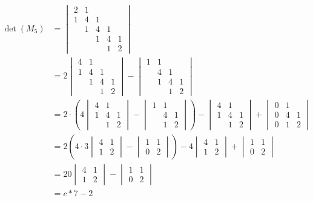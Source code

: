 \documentclass{article}
\begin{document}
\begin{align}
  \det (M_5) &= \begin{vmatrix}
      2 & 1 \\
      1 & 4 & 1\\
        & 1 & 4 & 1 \\
        & & 1 & 4 & 1 \\
        & & & 1 & 2
    \end{vmatrix} \\
  &= 2 \begin{vmatrix}
    4 & 1 \\ 1 & 4 & 1 \\
      & 1 & 4 & 1 \\ & & 1 & 2
  \end{vmatrix} - \begin{vmatrix}
    1 & 1 \\
      & 4 & 1 \\
      & 1 & 4 & 1 \\
      & & 1 & 2
  \end{vmatrix} \\
  &= 2 \cdot \left( 4 \begin{vmatrix}
    4 & 1 \\ 1 & 4 & 1 \\ & 1 & 2
  \end{vmatrix} - \begin{vmatrix}
    1 & 1 \\ & 4 & 1 \\ & 1 & 2
  \end{vmatrix} \right) - \begin{vmatrix}
    4 & 1 \\ 1 & 4 & 1 \\ & 1 & 2
  \end{vmatrix} + \begin{vmatrix}
    0 & 1 & \\ 0 & 4 & 1 \\ 0 & 1 & 2
  \end{vmatrix} \\
  &= 2 \left( 
    4 \cdot 3 \begin{vmatrix}
      4 & 1 \\ 1 & 2
    \end{vmatrix} - \begin{vmatrix}
      1 & 1 \\ 0 & 2
    \end{vmatrix}
    \right) - 4 \begin{vmatrix}
      4 & 1 \\ 1 & 2
    \end{vmatrix} + \begin{vmatrix}
      1 & 1 \\ 0 & 2
    \end{vmatrix} \\
  &= 20 \begin{vmatrix}
    4 & 1 \\ 1 & 2
  \end{vmatrix} - \begin{vmatrix}
    1 & 1 \\ 0 & 2
  \end{vmatrix} \\
  &= c * 7 - 2
\end{align}
\end{document}
